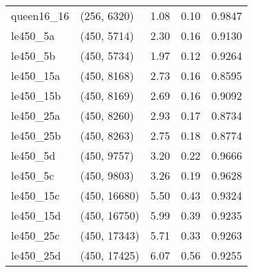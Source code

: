 \begin{tabular}{llrrr}
queen16\_16 &  (256, 6320) &      1.08 &     0.10 & 0.9847 \\
  le450\_5a &  (450, 5714) &      2.30 &     0.16 & 0.9130 \\
  le450\_5b &  (450, 5734) &      1.97 &     0.12 & 0.9264 \\
 le450\_15a &  (450, 8168) &      2.73 &     0.16 & 0.8595 \\
 le450\_15b &  (450, 8169) &      2.69 &     0.16 & 0.9092 \\
 le450\_25a &  (450, 8260) &      2.93 &     0.17 & 0.8734 \\
 le450\_25b &  (450, 8263) &      2.75 &     0.18 & 0.8774 \\
  le450\_5d &  (450, 9757) &      3.20 &     0.22 & 0.9666 \\
  le450\_5c &  (450, 9803) &      3.26 &     0.19 & 0.9628 \\
 le450\_15c & (450, 16680) &      5.50 &     0.43 & 0.9324 \\
 le450\_15d & (450, 16750) &      5.99 &     0.39 & 0.9235 \\
 le450\_25c & (450, 17343) &      5.71 &     0.33 & 0.9263 \\
 le450\_25d & (450, 17425) &      6.07 &     0.56 & 0.9255 \\
\bottomrule
\end{tabular}
